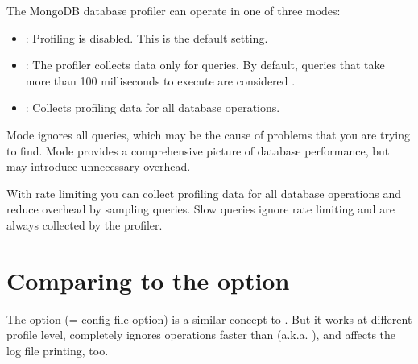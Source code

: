 \documentclass[letterpaper,10pt,english]{sphinxmanual}
\begin{document}
\sphinxAtStartPar
The MongoDB database profiler can operate in one of three modes:
\begin{itemize}
\item {} 
\sphinxAtStartPar
{}: Profiling is disabled. This is the default setting.

\item {} 
\sphinxAtStartPar
{}: The profiler collects data only for  queries.
By default, queries that take more than 100 milliseconds to execute
are considered .

\item {} 
\sphinxAtStartPar
{}: Collects profiling data for all database operations.

\end{itemize}

\sphinxAtStartPar
Mode  ignores all  queries,
which may be the cause of problems that you are trying to find.
Mode  provides a comprehensive picture of database performance,
but may introduce unnecessary overhead.

\sphinxAtStartPar
With rate limiting you can collect profiling data for all database operations
and reduce overhead by sampling queries.
Slow queries ignore rate limiting and are always collected by the profiler.


\section{Comparing to the  option}
\label{\detokenize{rate-limit:comparing-to-the-samplerate-option}}
\sphinxAtStartPar
The  option (=  config file option) is a similar
concept to . But it works at different profile level, completely
ignores operations faster than  (a.k.a. ), and affects the
log file printing, too.
\end{document}
